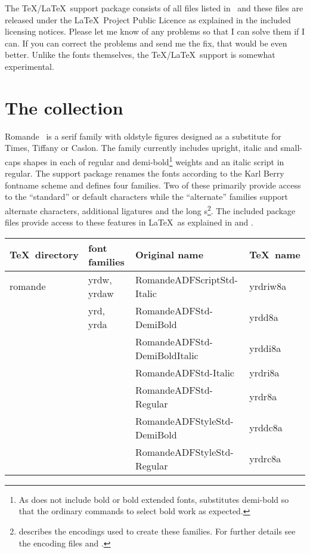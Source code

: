 \documentclass[11pt,british]{article}
\begin{document}
The \TeX/\LaTeX\ support package consists of all files listed in \ and these files are released under the \LaTeX\ Project Public Licence as explained in the included licensing notices. Please let me know of any problems so that I can solve them if I can. If you can correct the problems and send me the fix, that would be even better. Unlike the fonts themselves, the \TeX/\LaTeX\ support is somewhat experimental.

\section{The collection}

Romande \adf\ is a serif family with oldstyle figures designed as a substitute for Times, Tiffany or Caslon. The family currently includes upright, italic and small-caps shapes in each of regular and demi-bold\footnote{As  does not include bold or bold extended fonts,  substitutes demi-bold so that the ordinary commands to select bold work as expected.} weights and an italic script in regular. The support package renames the fonts according to the Karl Berry fontname scheme and defines four families. Two of these primarily provide access to the ``standard'' or default characters while the ``alternate'' families support alternate characters, additional ligatures and the long s\footnote{ describes the encodings used to create these families. For further details see the encoding files  and .}. The included package files provide access to these features in \LaTeX\ as explained in  and .

\clearpage

\begin{longtable}{llll}
	\toprule
	\textbf{\TeX\ directory}	&	\textbf{font families}	&	\textbf{Original name}	& \textbf{\TeX\ name}\\\midrule\endhead
		\bottomrule\endfoot
	romande		&	yrdw, yrdaw	&	RomandeADFScriptStd-Italic			&	yrdriw8a\\\cline{2-4}
						& yrd, yrda		&	RomandeADFStd-DemiBold				&	yrdd8a\\
						& 							&	RomandeADFStd-DemiBoldItalic	&	yrddi8a\\
						&							&	RomandeADFStd-Italic						&	yrdri8a\\
						&							&	RomandeADFStd-Regular					&	yrdr8a\\
						&							&	RomandeADFStyleStd-DemiBold	&	yrddc8a\\
						&							&	RomandeADFStyleStd-Regular		&	yrdrc8a\\

\end{longtable}
\end{document}
